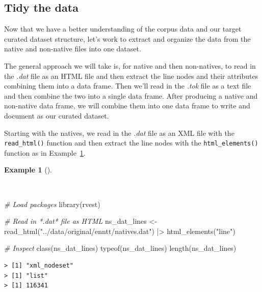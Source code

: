 \documentclass[
  letterpaper,
  DIV=11,
  numbers=noendperiod]{scrreport}
\newenvironment{Shaded}{\begin{snugshade}}{\end{snugshade}}
\newcommand{\CommentTok}[1]{\textcolor[rgb]{0.00,0.00,0.00}{\textit{#1}}}
\newcommand{\FunctionTok}[1]{\textcolor[rgb]{0.00,0.00,0.00}{#1}}
\newcommand{\NormalTok}[1]{\textcolor[rgb]{0.00,0.00,0.00}{#1}}
\newcommand{\OtherTok}[1]{\textcolor[rgb]{0.00,0.00,0.00}{#1}}
\newcommand{\SpecialCharTok}[1]{\textcolor[rgb]{0.00,0.00,0.00}{#1}}
\newcommand{\StringTok}[1]{\textcolor[rgb]{0.00,0.00,0.00}{#1}}
\theoremstyle{definition}
\newtheorem{example}{Example}[chapter]
\theoremstyle{remark}
\begin{document}
\hypertarget{tidy-the-data-1}{%
\subsection{Tidy the data}\label{tidy-the-data-1}}

Now that we have a better understanding of the corpus data and our
target curated dataset structure, let's work to extract and organize the
data from the native and non-native files into one dataset.

The general approach we will take is, for native and then non-natives,
to read in the \emph{.dat} file as an HTML file and then extract the
line nodes and their attributes combining them into a data frame. Then
we'll read in the \emph{.tok} file as a text file and then combine the
two into a single data frame. After producing a native and non-native
data frame, we will combine them into one data frame to write and
document as our curated dataset.

Starting with the natives, we read in the \emph{.dat} file as an XML
file with the \texttt{read\_html()} function and then extract the line
nodes with the \texttt{html\_elements()} function as in
Example~\ref{exm-cd-enntt-read-xml}.

\begin{example}[]\protect\hypertarget{exm-cd-enntt-read-xml}{}\label{exm-cd-enntt-read-xml}

~

\begin{Shaded}
\begin{Highlighting}[]
\CommentTok{\# Load packages}
\FunctionTok{library}\NormalTok{(rvest)}

\CommentTok{\# Read in *.dat* file as HTML}
\NormalTok{ns\_dat\_lines }\OtherTok{\textless{}{-}} 
  \FunctionTok{read\_html}\NormalTok{(}\StringTok{"../data/original/enntt/natives.dat"}\NormalTok{) }\SpecialCharTok{|\textgreater{}} 
  \FunctionTok{html\_elements}\NormalTok{(}\StringTok{"line"}\NormalTok{)}

\CommentTok{\# Inspect}
\FunctionTok{class}\NormalTok{(ns\_dat\_lines)}
\FunctionTok{typeof}\NormalTok{(ns\_dat\_lines)}
\FunctionTok{length}\NormalTok{(ns\_dat\_lines)}
\end{Highlighting}
\end{Shaded}

\begin{verbatim}
> [1] "xml_nodeset"
> [1] "list"
> [1] 116341
\end{verbatim}

\end{example}
\end{document}
